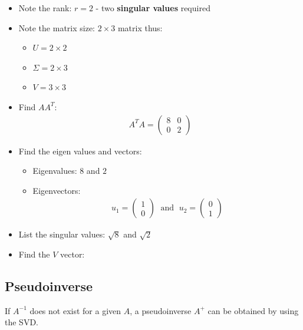 \documentclass[10pt,a4paper]{article}
\begin{document}
\begin{itemize}
    \item Note the rank: $r = 2$ - two \textbf{singular values} required
    \item Note the matrix size: $2\times 3$ matrix thus:
    \begin{itemize}
        \item $U = 2\times 2$
        \item $\Sigma = 2 \times 3$
        \item $V = 3 \times 3$
    \end{itemize}
    \item Find $A A^T$: 
    \begin{align*}
        A^T A = \begin{pmatrix}
            8&0\\0&2
        \end{pmatrix}
    \end{align*}
    \item Find the eigen values and vectors:
    \begin{itemize}
        \item Eigenvalues: $8$ and $2$
        \item Eigenvectors:
        \begin{align*}
            u_1 = \begin{pmatrix}
                1\\0
            \end{pmatrix}
            \; \text{ and } \;
            u_2 = \begin{pmatrix}
                0\\1
            \end{pmatrix}
        \end{align*}
    \end{itemize}
    \item List the singular values: $\sqrt{8}$ and $\sqrt{2}$
    \item Find the $V$ vector:
    
\end{itemize}


\pagebreak
\subsection{Pseudoinverse}

If $A^{-1}$ does not exist for a given $A$, a pseudoinverse $A^+$ can be obtained by using the SVD.
\end{document}
